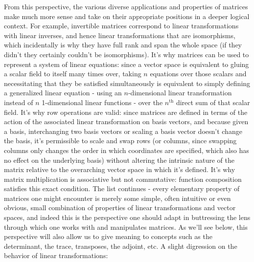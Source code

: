 \documentclass{article}
\newcommand{\n}{\leavevmode \newline}
\newcommand{\nn}{\leavevmode \newline \newline}
\begin{document}
From this perspective, the various diverse applications and properties of matrices make much more sense and take on their appropriate positions in a deeper logical context. For example, invertible matrices correspond to linear transformations with linear inverses, and hence linear transformations that are isomorphisms, which incidentally is why they have full rank and span the whole space (if they didn't they certainly couldn't be isomorphisms). It's why matrices can be used to represent a system of linear equations: since a vector space is equivalent to gluing a scalar field to itself many times over, taking $ n $ equations over those scalars and necessitating that they be satisfied simultaneously is equivalent to simply defining a generalized linear equation - using an $ n $-dimensional linear transformation instead of $ n $ 1-dimensional linear functions - over the $ n^\text{th} $ direct sum of that scalar field. It's why row operations are valid: since matrices are defined in terms of the action of the associated linear transformation on basis vectors, and because given a basis, interchanging two basis vectors or scaling a basis vector doesn't change the basis, it's permissible to scale and swap rows (or columns, since swapping columns only changes the order in which coordinates are specified, which also has no effect on the underlying basis) without altering the intrinsic nature of the matrix relative to the overarching vector space in which it's defined. It's why matrix multiplication is associative but not commutative: function composition satisfies this exact condition. The list continues - every elementary property of matrices one might encounter is merely some simple, often intuitive or even obvious, small combination of properties of linear transformations and vector spaces, and indeed this is the perspective one should adapt in buttressing the lens through which one works with and manipulates matrices. As we'll see below, this perspective will also allow us to give meaning to concepts such as the determinant, the trace, transposes, the adjoint, etc.
\nn
A slight digression on the behavior of linear transformations:
\n
\end{document}
